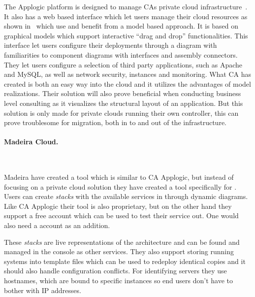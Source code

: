 The Applogic platform is designed to manage CAs private cloud 
infrastructure~\cite{introducing-cloud-services}.
It also has a web based interface which let users manage their cloud resources 
as shown in~ which use and benefit from a model based approach.
It is based on graphical models which support interactive ``drag and drop'' functionalities.
This interface let users configure their deployments through a diagram with familiarities to 
 component diagrams with interfaces and assembly connectors. 
They let users configure a selection of third party applications, 
such as Apache and MySQL, as well as network security, instances and monitoring. 
What CA has created is both an easy way into the cloud and it utilizes 
the advantages of model realizations. 
Their solution will also prove beneficial when conducting business level consulting
as it visualizes the structural layout of an application.
But this solution is only made for private clouds running their own controller, 
this can prove troublesome for migration, both in to and out of the infrastructure.

\paragraph{Madeira Cloud.}~\cite{madeiracloud}



Madeira have created a tool which is similar to CA Applogic, but instead of focusing
on a private cloud solution they have created a tool specifically for  .
Users can create \emph{stacks} with the available services in  through 
dynamic diagrams.
Like CA Applogic their tool is also proprietary, but on the other hand they support
a free account which can be used to test their service out.
One would also need a  account as an addition.

These \emph{stacks} are live representations of the architecture and can be found 
and managed in the  console as other  services.
They also support storing running systems into template files which can be used
to redeploy identical copies and it should also handle configuration conflicts.
For identifying servers they use hostnames, which are bound to specific instances 
so end users don't have to bother with IP addresses.



